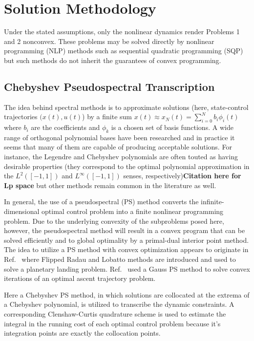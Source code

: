 \documentclass[10pt,a4paper]{article}
\begin{document}
	\section{Solution Methodology}
	Under the stated assumptions, only the nonlinear dynamics render Problems 1 and 2 nonconvex. These problems may be solved directly by nonlinear programming (NLP) methods such as sequential quadratic programming (SQP) but such methods do not inherit the guarantees of convex programming.
	
	
	

	
	\subsection{Chebyshev Pseudospectral Transcription}
	The idea behind spectral methods is to approximate solutions (here, state-control trajectories $ (x(t),u(t) $) by a finite sum $x(t) \approx x_N(t) = \sum_{i=0}^{N}b_i\phi_i(t)$ where $b_i$ are the coefficients and $ {\phi_k} $ is a chosen set of basis functions. A wide range of orthogonal polynomial bases have been researched \cite{ChebyPS,LegendrePS,RadauPS,GPOPS} and in practice it seems that many of them are capable of producing acceptable solutions. For instance, the Legendre and Chebyshev polynomials are often touted as having desirable properties (they correspond to the optimal polynomial approximation in the $L^2([-1,1])$ and $L^\infty([-1,1])$ senses, respectively)\textbf{Citation here for Lp space} but other methods remain common in the literature as well.
	
	In general, the use of a pseudospectral (PS) method converts the infinite-dimensional optimal control problem into a finite nonlinear programming problem. Due to the underlying convexity of the subproblems posed here, however, the pseudospectral method will result in a convex program that can be solved efficiently and to global optimality by a primal-dual interior point method. The idea to utilize a PS method with convex optimization appears to originate in Ref.~\cite{PS_Convex} where Flipped Radau and Lobatto methods are introduced and used to solve a planetary landing problem. Ref.~\cite{PS_Convex_ascent} used a Gauss PS method to solve convex iterations of an optimal ascent trajectory problem. 
	
	Here a Chebyshev PS method, in which solutions are collocated at the extrema of a Chebyshev polynomial, is utilized to transcribe the dynamic constraints. A corresponding Clenshaw-Curtis quadrature scheme is used to estimate the integral in the running cost of each optimal control problem because it's integration points are exactly the collocation points.\cite{CCQuad}
	
\end{document}
